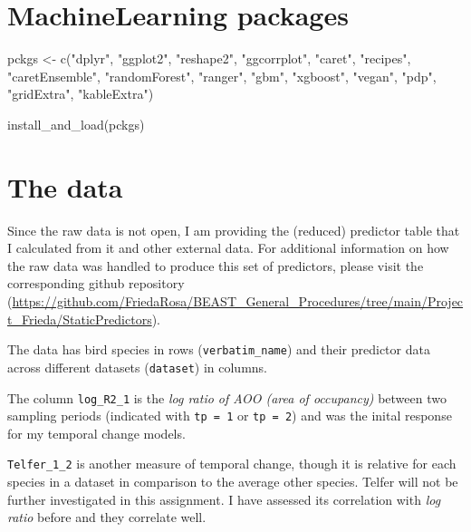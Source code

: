 \documentclass[
  letterpaper,
  DIV=11,
  numbers=noendperiod]{scrreprt}
\newenvironment{Shaded}{\begin{snugshade}}{\end{snugshade}}
\newcommand{\FunctionTok}[1]{\textcolor[rgb]{0.28,0.35,0.67}{#1}}
\newcommand{\NormalTok}[1]{\textcolor[rgb]{0.00,0.23,0.31}{#1}}
\newcommand{\OtherTok}[1]{\textcolor[rgb]{0.00,0.23,0.31}{#1}}
\newcommand{\StringTok}[1]{\textcolor[rgb]{0.13,0.47,0.30}{#1}}
\begin{document}
\section{MachineLearning packages}

\begin{Shaded}
\begin{Highlighting}[]
\NormalTok{pckgs }\OtherTok{\textless{}{-}} \FunctionTok{c}\NormalTok{(}\StringTok{"dplyr"}\NormalTok{, }\StringTok{"ggplot2"}\NormalTok{, }\StringTok{"reshape2"}\NormalTok{, }
           \StringTok{"ggcorrplot"}\NormalTok{, }
           \StringTok{"caret"}\NormalTok{,  }\StringTok{"recipes"}\NormalTok{,   }\StringTok{"caretEnsemble"}\NormalTok{, }
           \StringTok{"randomForest"}\NormalTok{, }\StringTok{"ranger"}\NormalTok{, }\StringTok{"gbm"}\NormalTok{, }\StringTok{"xgboost"}\NormalTok{, }
           \StringTok{"vegan"}\NormalTok{, }\StringTok{"pdp"}\NormalTok{, }
           \StringTok{"gridExtra"}\NormalTok{, }\StringTok{"kableExtra"}\NormalTok{)}

\FunctionTok{install\_and\_load}\NormalTok{(pckgs)}
\end{Highlighting}
\end{Shaded}

\section{The data}\label{the-data}

Since the raw data is not open, I am providing the (reduced) predictor
table that I calculated from it and other external data. For additional
information on how the raw data was handled to produce this set of
predictors, please visit the corresponding github repository
(\url{https://github.com/FriedaRosa/BEAST_General_Procedures/tree/main/Project_Frieda/StaticPredictors}).

The data has bird species in rows (\texttt{verbatim\_name}) and their
predictor data across different datasets (\texttt{dataset}) in columns.

The column \texttt{log\_R2\_1} is the \emph{log ratio of AOO (area of
occupancy)} between two sampling periods (indicated with
\texttt{tp\ =\ 1} or \texttt{tp\ =\ 2}) and was the inital response for
my temporal change models.

\texttt{Telfer\_1\_2} is another measure of temporal change, though it
is relative for each species in a dataset in comparison to the average
other species. Telfer will not be further investigated in this
assignment. I have assessed its correlation with \emph{log ratio} before
and they correlate well.
\end{document}
